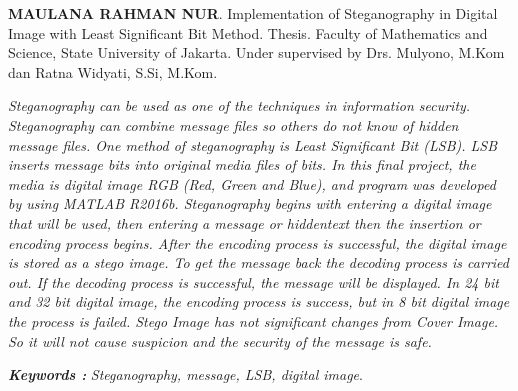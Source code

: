 \documentclass{jtetiskripsi}
\begin{document}
\begin{abstracteng}
\textbf{MAULANA RAHMAN NUR}. Implementation of Steganography in Digital Image with Least Significant Bit Method. Thesis. Faculty of Mathematics and Science, State University of Jakarta. Under supervised by Drs. Mulyono, M.Kom dan Ratna Widyati, S.Si, M.Kom.
\vskip1cm

	\textit{Steganography can be used as one of the techniques in information security. Steganography can combine message files so others do not know of hidden message files. One method of steganography is Least Significant Bit (LSB). LSB inserts message bits into original media files of bits. In this final project, the media is digital image RGB (Red, Green and Blue), and program was developed by using MATLAB R2016b. Steganography begins with entering a digital image that will be used, then entering a message or hiddentext then the insertion or encoding process begins. After the encoding process is successful, the digital image is stored as a stego image. To get the message back the decoding process is carried out. If the decoding process is successful, the message will be displayed. In 24 bit and 32 bit digital image, the encoding process is success, but in 8 bit digital image the process is failed. Stego Image has not significant changes from Cover Image. So it will not cause suspicion and the security of the message is safe.}    
	
	\bigskip
	\noindent
	\textbf{\emph{Keywords :}} \emph{Steganography, message, LSB, digital image}.
\end{abstracteng}


\tableofcontents 
\listoffigures
\listoftables
{}

\begin{counterpage}
\end{counterpage}

\end{document}
